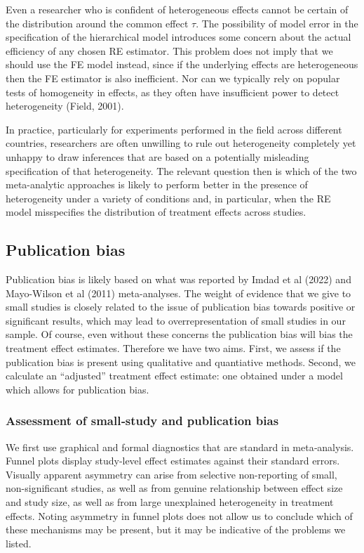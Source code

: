 \documentclass[12pt]{article}
\begin{document}
Even a researcher who is confident of heterogeneous effects cannot be certain of the distribution around the common effect $\tau$. The possibility of model error in the specification of the hierarchical model introduces some concern about the actual efficiency of any chosen RE estimator. This problem does not imply that we should use the FE model instead, since if the underlying effects are heterogeneous then the FE estimator is also inefficient. Nor can we typically rely on popular tests of homogeneity in effects, as they often have insufficient power to detect heterogeneity (Field, 2001). 

In practice, particularly for experiments performed in the field across different countries, researchers are often unwilling to rule out heterogeneity completely yet unhappy to draw inferences that are based on a potentially misleading specification of that heterogeneity. The relevant question then is which of the two meta-analytic approaches is likely to perform better in the presence of heterogeneity under a variety of conditions and, in particular, when the RE model misspecifies the distribution of treatment effects across studies.



\subsection{Publication bias}

Publication bias is likely based on what was reported by Imdad et al (2022) and Mayo-Wilson et al (2011) meta-analyses. The weight of evidence that we give to small studies is closely related to the issue of publication bias towards positive or significant results, which may lead to overrepresentation of small studies in our sample. Of course, even without these concerns the publication bias will bias the treatment effect estimates. Therefore we have two aims. First, we assess if the publication bias is present using qualitative and quantiative methods. Second, we calculate an ``adjusted'' treatment effect estimate: one obtained under a model which allows for publication bias.

\subsubsection{Assessment of small‐study and publication bias}

We first use graphical and formal diagnostics that are standard in meta‐analysis. Funnel plots display study‐level effect estimates against their standard errors. Visually apparent asymmetry can arise from selective non-reporting of small, non-significant studies, as well as from genuine relationship between effect size and study size, as well as from large unexplained heterogeneity in treatment effects. Noting asymmetry in funnel plots does not allow us to conclude which of these mechanisms may be present, but it may be indicative of the problems we listed.
\end{document}

